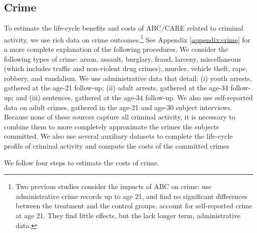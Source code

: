 \subsection{Crime}  \label{sec:crime}

To estimate the life-cycle benefits and costs of ABC/CARE related to criminal activity, we use rich data on crime outcomes.\footnote{Two previous studies consider the impacts of ABC on crime: \citet{Clarke_Campbell_1998_ABC_Comparison_ECRQ} use administrative crime records up to age 21, and find no significant differences between the treatment and the control groups. \cite{Barnett_Masse_2002_benefitcost,Barnett_Masse_2007_EER} account for self-reported crime at age 21. They find little effects, but the lack longer term, administrative data.} See Appendix \ref{appendix:crime} for a more complete explanation of the following procedures. We consider the following types of crime: arson, assault, burglary, fraud, larceny, miscellaneous (which includes traffic and non-violent drug crimes), murder, vehicle theft, rape, robbery, and vandalism. We use administrative data that detail: (i) youth arrests, gathered at the age-21 follow-up; (ii) adult arrests, gathered at the age-34 follow-up; and (iii) sentences, gathered at the age-34 follow-up. We also use self-reported data on adult crimes, gathered in the age-21 and age-30 subject interviews. Because none of these sources capture all criminal activity, it is necessary to combine them to more completely approximate the crimes the subjects committed. We also use several auxiliary datasets to complete the life-cycle profile of criminal activity and compute the costs of the committed crimes

We follow four steps to estimate the costs of crime.

